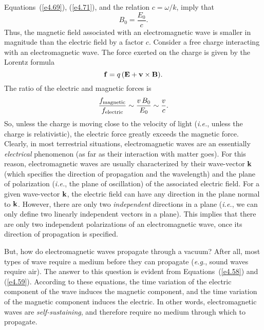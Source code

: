 Equations~(\ref{e4.69}), (\ref{e4.71}), and the relation $c = \omega/k$, imply that
\begin{equation}
B_0= \frac{E_0}{c}.
\end{equation}
Thus, the magnetic field associated with  an electromagnetic wave is smaller
in magnitude than the electric field by a factor $c$. Consider
a free charge interacting with an electromagnetic wave. The force exerted on the
charge is given by the Lorentz formula
\begin{equation}
{\bf f} = q \,({\bf E} +{\bf v}\times{\bf B}).
\end{equation}
The ratio of the electric and magnetic forces is
\begin{equation}
\frac{f_{\rm magnetic}}{f_{\rm electric}} \sim \frac{v\,B_0}{E_0} \sim 
\frac{v}{c}.
\end{equation}
So, unless the charge  is moving close to the velocity of light ({\em i.e.}, unless the charge is relativistic), the electric force greatly exceeds the
magnetic force. Clearly, in most terrestrial situations, electromagnetic waves are
an essentially {\em electrical}\/ phenomenon (as far as their interaction with matter goes).
For this reason, electromagnetic waves are usually characterized by their wave-vector ${\bf k}$
(which specifies the direction of propagation and the wavelength) and
the plane of polarization ({\em i.e.}, the plane of oscillation) of the associated electric
field. For a given wave-vector ${\bf k}$, the electric field can have any direction in
the plane normal to ${\bf k}$. However, there are only two {\em independent}\/
directions in a plane ({\em i.e.}, we can only define two linearly independent 
vectors in a plane). This implies that there are only two independent polarizations
of an electromagnetic wave, once its direction of propagation is 
specified.

But, how do electromagnetic waves propagate through a vacuum? After
all, most types of wave require a medium before they can propagate
({\em e.g.}, sound waves require air). The answer to this question
is evident from Equations~(\ref{e4.58}) and (\ref{e4.59}). According to these
equations, the time variation of the electric component of the
wave induces the magnetic component, and the time variation of
the magnetic component induces the electric. In other words, electromagnetic
waves are {\em self-sustaining}, and therefore require no medium through which
to propagate.

